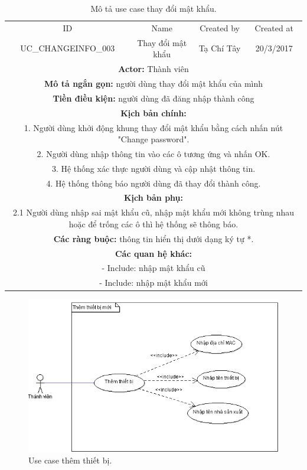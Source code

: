 \documentclass[a4paper,12pt,oneside]{article}
\begin{document}
\begin{table}[!htp]
\centering
\begin{tabularx}{\linewidth}{ |c||c|c|c| }
\hline
ID & Name & Created by & Created at\\
UC\_CHANGEINFO\_003 & Thay đổi mật khẩu & Tạ Chí Tây & 20/3/2017\\
\hline
\multicolumn{4}{|X|}{\textbf{Actor:} Thành viên }\\
\hline
\multicolumn{4}{|X|}{\textbf{Mô tả ngắn gọn:} người dùng thay đổi mật khẩu của mình}\\
\hline
\multicolumn{4}{|X|}{\textbf{Tiền điều kiện:} người dùng đã đăng nhập thành công}\\
\hline
\multicolumn{4}{|X|}{\textbf{Kịch bản chính:}}\\
\multicolumn{4}{|X|}{1. Người dùng khởi động khung thay đổi mật khẩu bằng cách nhấn nút "Change password".}\\
\multicolumn{4}{|X|}{
2.	Người dùng nhập thông tin vào các ô tương ứng và nhấn OK.}\\
\multicolumn{4}{|X|}{
3.	Hệ thống xác thực người dùng và cập nhật thông tin.}\\
\multicolumn{4}{|X|}{
4.	Hệ thống thông báo người dùng đã thay đổi thành công.}\\
\hline
\multicolumn{4}{|X|}{\textbf{Kịch bản phụ:}}\\
\multicolumn{4}{|X|}{2.1    Người dùng nhập sai mật khẩu cũ, nhập mật khẩu mới không trùng nhau hoặc để trống các ô thì hệ thống sẽ thông báo.}\\
\hline
\multicolumn{4}{|X|}{\textbf{Các ràng buộc:} thông tin hiển thị dưới dạng ký tự *.}\\
\hline
\multicolumn{4}{|X|}{\textbf{Các quan hệ khác:}}\\
\multicolumn{4}{|X|}{- Include: nhập mật khẩu cũ}\\
\multicolumn{4}{|X|}{- Include: nhập mật khẩu mới}\\
\hline
\end{tabularx}
\caption{Mô tả use case thay đổi mật khẩu.}
\end{table}

\begin{figure}[H]
	\centering
	\includegraphics[scale=.9]{hinh/adddevice.png}
	\caption{Use case thêm thiết bị.}
\end{figure}
\end{document}
